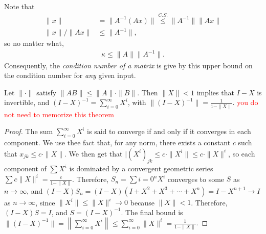 \documentclass{ximera}
\begin{document}
    Note that
    \begin{align*}
        \|x\| &= \|A^{-1}(Ax)\| \stackrel{C.S.}\leq \|A^{-1}\|\|Ax\|
        \\
        \|x\|/\|Ax\| &\leq \|A^{-1}\|,
    \end{align*}
    so no matter what,
    \begin{align*}
        \kappa \leq \|A\|\|A^{-1}\|.
    \end{align*}
    Consequently, the \textit{condition number of a matrix} is give by this upper bound on the condition number for \textit{any} given input.


    \begin{theorem}
        Let $\|\cdot\|$ satisfy $\|AB\| \leq \|A\|\cdot\|B\|$.  Then $\|X\|< 1$ implies that $I-X$ is invertible, and $(I-X)^{-1} = \sum\limits_{i=0}^\infty X^i$, with $\|(I-X)^{-1}\| = \frac{1}{1-\|X\|}$. \textcolor{red}{you do not need to memorize this theorem}
    \end{theorem}
    \begin{proof}
        The sum $\sum\limits_{i=0}^\infty X^i$ is said to converge if and only if it converges in each component.  We use thee fact that, for any norm, there exists a constant $c$ such that $x_{jk} \leq c \cdot\|X\|$.  We then get that $|(X^i)_{jk} \leq c\cdot \|X^i\| \leq c\cdot \|X\|^i$, so each component of $\sum X^i$ is dominated by a convergent geometric series $\sum c \|X\|^i = \frac{c}{1-\|X\|}$.  Therefore, $S_n = \sum\limits{i=0}^n X^i$ converges to some $S$ as $n \to \infty$, and $(I-X)S_n = (I-X)(I+X^2+X^3 + \cdots + X^n) = I-X^{n+1} \to I$ as $n \to \infty$, since $\|X^i\| \leq \|X\|^i \to 0$ because $\|X\| < 1$.  Therefore, $(I-X)S = I$, and $S = (I-X)^{-1}$.  The final bound is $\|(I-X)^{-1}\| = \left\|\sum\limits_{i=0}^\infty X^i \right\| \leq \sum\limits_{i=0}^\infty \|X\|^i = \frac{1}{1-\|X\|}$.
    \end{proof}


    
\end{document}
